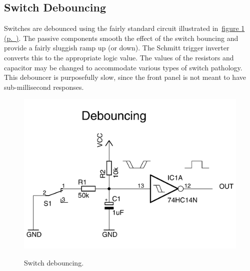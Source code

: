 \documentclass[11pt,a4paper,twocolumns]{article}
\newcommand{\cf}[2][section]{\hyperref[#2]{#1 \ref*{#2} (p.~\pageref*{#2})}}
\newcommand{\fcf}[1]{\cf[figure]{#1}}
\begin{document}
\subsection{Switch Debouncing}

Switches are debounced using the fairly standard circuit illustrated
in~\fcf{fig-switch-debounce}. The passive components smooth the effect of the
switch bouncing and provide a fairly sluggish ramp up (or down). The Schmitt
trigger inverter converts this to the appropriate logic value. The values of
the resistors and capacitor may be changed to accommodate various types of
switch pathology. This debouncer is purposefully slow, since the front panel is
not meant to have sub-millisecond responses.

\begin{figure}
\centering
\includegraphics[width=0.85\columnwidth]{figs/debouncing.pdf}\\
\caption{\label{fig-switch-debounce}Switch debouncing.}
\end{figure}
\end{document}
